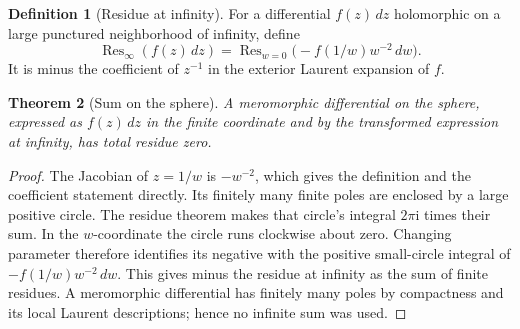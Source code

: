\documentclass[11pt,a4paper,openany]{book}
\newtheorem{theorem}{Theorem}[chapter]
\theoremstyle{definition}
\newtheorem{definition}[theorem]{Definition}
\theoremstyle{remark}\newtheorem{remark}[theorem]{Remark}
\newcommand{\dd}{\,d}\newcommand{\iu}{\mathrm i}
\DeclareMathOperator{\Res}{Res}\DeclareMathOperator{\ind}{ind}
\newcommand{\family}[1]{}
\begin{document}
\begin{definition}[Residue at infinity]\family{D12.08.03}\label{d12:08-03}
For a differential \(f(z)\dd z\) holomorphic on a large punctured
neighborhood of infinity, define
\[
 \Res_\infty(f(z)\dd z)
   =\Res_{w=0}\bigl(-f(1/w)w^{-2}\dd w\bigr).
\]
It is minus the coefficient of \(z^{-1}\) in the exterior Laurent
expansion of \(f\).
\end{definition}
\begin{theorem}[Sum on the sphere]\label{d12:08-03-sum}
A meromorphic differential on the sphere, expressed as \(f(z)\dd z\)
in the finite coordinate and by the transformed expression at infinity,
has total residue zero.
\end{theorem}
\begin{proof}
The Jacobian of \(z=1/w\) is \(-w^{-2}\), which gives the definition
and the coefficient statement directly.
Its finitely many finite poles are enclosed by a large positive circle.
The residue theorem makes that circle's integral \(2\pi\iu\) times
their sum. In the \(w\)-coordinate the circle runs clockwise about zero.
Changing parameter therefore identifies its negative with the positive
small-circle integral of \(-f(1/w)w^{-2}\dd w\).
This gives minus the residue at infinity as the sum of finite residues.
A meromorphic differential has finitely many poles by compactness
and its local Laurent descriptions; hence no infinite sum was used.
\end{proof}
\end{document}
